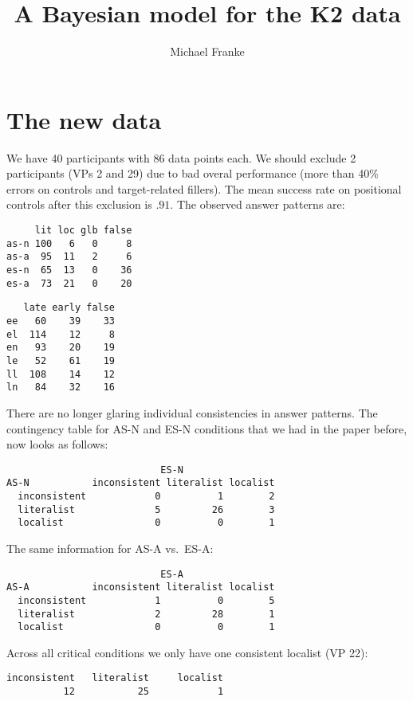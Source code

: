 \documentclass[fleqn,reqno,10pt]{article}
\title{A Bayesian model for the K2 data}
\author{Michael Franke}
\date{}
\begin{document}
\maketitle

\section{The new data}

We have 40 participants with 86 data points each. We should exclude 2
participants (VPs 2 and 29) due to bad overal performance (more than
40\% errors on controls and target-related fillers). The mean success
rate on positional controls after this exclusion is $.91$. The
observed answer patterns are:

\medskip

\begin{minipage}[t]{0.45\linewidth}
\begin{verbatim}
     lit loc glb false
as-n 100   6   0     8
as-a  95  11   2     6
es-n  65  13   0    36
es-a  73  21   0    20
\end{verbatim}
\end{minipage}
\begin{minipage}[t]{0.45\linewidth}
\begin{verbatim}
   late early false
ee   60    39    33
el  114    12     8
en   93    20    19
le   52    61    19
ll  108    14    12
ln   84    32    16
\end{verbatim}
\end{minipage}

\medskip

There are no longer glaring individual consistencies in answer
patterns. The contingency table for AS-N and ES-N conditions that we
had in the paper before, now looks as follows:
\begin{verbatim}
                           ES-N
AS-N           inconsistent literalist localist
  inconsistent            0          1        2
  literalist              5         26        3
  localist                0          0        1
\end{verbatim}
The same information for AS-A vs.~ES-A:
\begin{verbatim}
                           ES-A
AS-A           inconsistent literalist localist
  inconsistent            1          0        5
  literalist              2         28        1
  localist                0          0        1
\end{verbatim}
Across all critical conditions we only have one consistent localist
(VP 22):
\begin{verbatim}
inconsistent   literalist     localist 
          12           25            1 
\end{verbatim}
\end{document}
